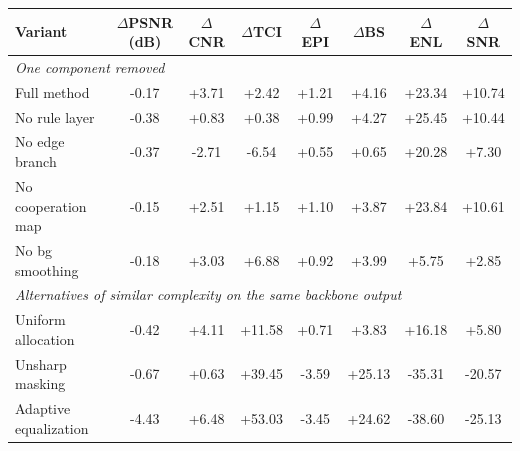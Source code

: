 \begin{tabular}{lccccccc}
\toprule
Variant & $\Delta$PSNR (dB) & $\Delta$CNR & $\Delta$TCI & $\Delta$EPI & $\Delta$BS & $\Delta$ENL & $\Delta$SNR \\
\midrule
\multicolumn{8}{l}{\textit{One component removed}} \\
Full method & -0.17 & +3.71 & +2.42 & +1.21 & +4.16 & +23.34 & +10.74 \\
No rule layer & -0.38 & +0.83 & +0.38 & +0.99 & +4.27 & +25.45 & +10.44 \\
No edge branch & -0.37 & -2.71 & -6.54 & +0.55 & +0.65 & +20.28 & +7.30 \\
No cooperation map & -0.15 & +2.51 & +1.15 & +1.10 & +3.87 & +23.84 & +10.61 \\
No bg smoothing & -0.18 & +3.03 & +6.88 & +0.92 & +3.99 & +5.75 & +2.85 \\
\midrule
\multicolumn{8}{l}{\textit{Alternatives of similar complexity on the same backbone output}} \\
Uniform allocation & -0.42 & +4.11 & +11.58 & +0.71 & +3.83 & +16.18 & +5.80 \\
Unsharp masking & -0.67 & +0.63 & +39.45 & -3.59 & +25.13 & -35.31 & -20.57 \\
Adaptive equalization & -4.43 & +6.48 & +53.03 & -3.45 & +24.62 & -38.60 & -25.13 \\
\bottomrule
\end{tabular}
